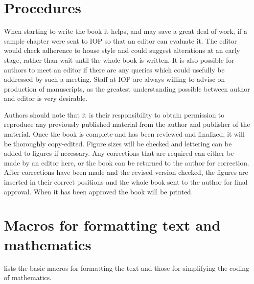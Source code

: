 \chapter{Procedures}
When starting to write the book it helps, and may save a great 
deal of work, if a sample chapter were sent to 
IOP so that an editor 
can evaluate it. 
The editor would check adherence to house style
and could suggest alterations at an early stage, rather than wait until the 
whole book is written. It is also possible for authors to meet an editor if 
there are any queries which could usefully be addressed by such a meeting. 
Staff at IOP are always willing to advise on production of 
manuscripts, as the greatest understanding possible between author and 
editor is very desirable.

Authors should note that
it is their responsibility to obtain permission to reproduce any
previously published material from the author and publisher of the
material.
Once the book is complete and has been reviewed and finalized, it will be 
thoroughly copy-edited.
Figure sizes will be checked and 
lettering can be added to figures if necessary. 
Any corrections that are required can either be made 
by an editor here, or the book can be returned to the author for correction. 
After corrections have been made and the revised 
version checked, the figures are inserted in their correct positions and the 
whole book sent to the author for final approval. When it has been 
approved the book will be printed.



\appendix

\chapter{Macros for formatting text and mathematics}

 lists the basic macros for formatting the text and
 those for simplifying the coding of mathematics.

